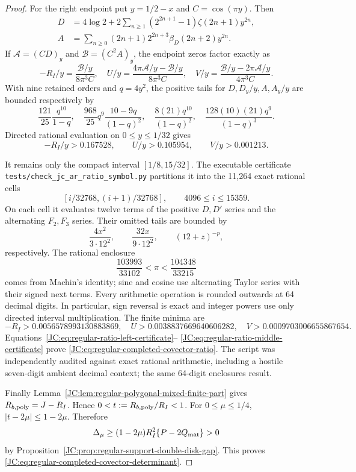 \documentclass[11pt]{amsart}
\numberwithin{equation}{section}
\theoremstyle{definition}
\theoremstyle{remark}
\begin{document}
\begin{proof}
For the right endpoint put $y=1/2-x$ and $C=\cos(\pi y)$.  Then
\begin{align*}
 D&=4\log2+2\sum_{n\ge1}(2^{2n+1}-1)\zeta(2n+1)y^{2n},\\
 A&=\sum_{n\ge0}(2n+1)2^{2n+3}\beta_D(2n+2)y^{2n}.
\end{align*}
If $\mathcal A=(CD)_y$ and $\mathcal B=(C^2A)_y$, the endpoint zeros
factor exactly as
\[
 -R_I/y=\frac{\mathcal B/y}{8\pi^3C},\quad
 U/y=\frac{4\pi\mathcal A/y-\mathcal B/y}{8\pi^3C},\quad
 V/y=\frac{\mathcal B/y-2\pi\mathcal A/y}{4\pi^3C}.
\]
With nine retained orders and $q=4y^2$, the positive tails for
$D,D_y/y,A,A_y/y$ are bounded respectively by
\[
 \frac{121}{25}\frac{q^{10}}{1-q},\quad
 \frac{968}{25}q^9\frac{10-9q}{(1-q)^2},\quad
 \frac{8(21)q^{10}}{(1-q)^2},\quad
 \frac{128(10)(21)q^9}{(1-q)^3}.
\]
Directed rational evaluation on $0\le y\le1/32$ gives
\begin{equation}\label{JC:eq:regular-ratio-right-certificate}
 -R_I/y>0.167528,\qquad U/y>0.105954,\qquad V/y>0.001213.
\end{equation}

It remains only the compact interval $[1/8,15/32]$.  The executable
certificate
\texttt{tests/check\_jc\_ar\_ratio\_symbol.py} partitions it into the
11,264 exact rational cells
\[
 [i/32768,(i+1)/32768],\qquad4096\le i\le15359.
\]
On each cell it evaluates twelve terms of the positive $D,D'$ series and
the alternating $F_2,F_3$ series.  Their omitted tails are bounded by
\[
 \frac{4x^2}{3\cdot12^2},\qquad
 \frac{32x}{9\cdot12^2},\qquad (12+z)^{-p},
\]
respectively.  The rational enclosure
\[
 \frac{103993}{33102}<\pi<\frac{104348}{33215}
\]
comes from Machin's identity; sine and cosine use alternating Taylor
series with their signed next terms.  Every arithmetic operation is
rounded outwards at 64 decimal digits.  In particular, sign reversal is
exact and integer powers use only directed interval multiplication.  The
finite minima are
\begin{equation}\label{JC:eq:regular-ratio-middle-certificate}
 -R_I>0.0056578993130883869,\quad
 U>0.0038837669640606282,\quad
 V>0.0009703006655867654.
\end{equation}
Equations~\eqref{JC:eq:regular-ratio-left-certificate}--
\eqref{JC:eq:regular-ratio-middle-certificate} prove
\eqref{JC:eq:regular-completed-covector-ratio}.  The script was independently
audited against exact rational arithmetic, including a hostile seven-digit
ambient decimal context; the same 64-digit enclosures result.

Finally Lemma~\ref{JC:lem:regular-polygonal-mixed-finite-part} gives
$R_{b,{\rm poly}}=J-R_I$.  Hence
$0<t:=R_{b,{\rm poly}}/R_I<1$.  For $0\le\mu\le1/4$,
$|t-2\mu|\le1-2\mu$.  Therefore
\[
 \Delta_\mu\ge(1-2\mu)R_I^2\{P-2Q_{\rm mat}\}>0
\]
by Proposition~\ref{JC:prop:regular-support-double-disk-gap}.  This proves
\eqref{JC:eq:regular-completed-covector-determinant}.
\end{proof}
\end{document}
